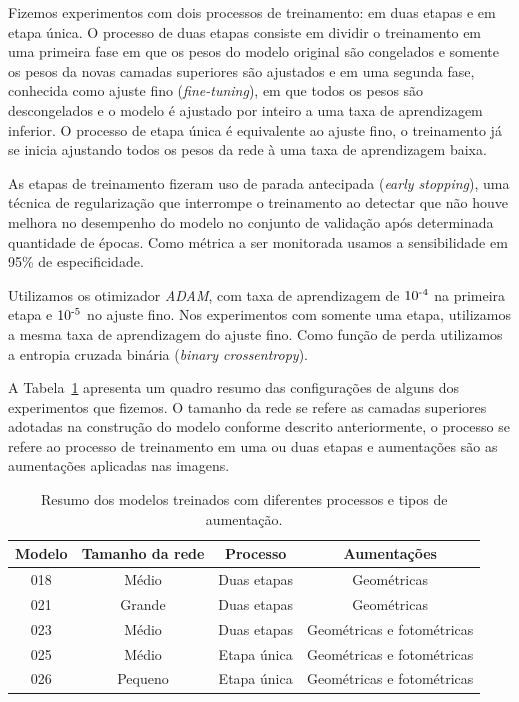 \documentclass[12pt]{article}
\begin{document}
Fizemos experimentos com dois processos de treinamento: em duas etapas e em etapa única. O processo de duas etapas consiste em dividir o treinamento em uma primeira fase em que os pesos do modelo original são congelados e somente os pesos da novas camadas superiores são ajustados e em uma segunda fase, conhecida como ajuste fino (\emph{fine-tuning}), em que todos os pesos são descongelados e o modelo é ajustado por inteiro a uma taxa de aprendizagem inferior. O processo de etapa única é equivalente ao ajuste fino, o treinamento já se inicia ajustando todos os pesos da rede à uma taxa de aprendizagem baixa.

As etapas de treinamento fizeram uso de parada antecipada (\emph{early stopping}), uma técnica de regularização que interrompe o treinamento ao detectar que não houve melhora no desempenho do modelo no conjunto de validação após determinada quantidade de épocas. Como métrica a ser monitorada usamos a sensibilidade em 95\% de especificidade.

Utilizamos os otimizador \emph{ADAM}, com taxa de aprendizagem de $10\textsuperscript{-4}$ na primeira etapa e $10\textsuperscript{-5}$ no ajuste fino. Nos experimentos com somente uma etapa, utilizamos a mesma taxa de aprendizagem do ajuste fino. Como função de perda utilizamos a entropia cruzada binária (\emph{binary crossentropy}).

A Tabela~\ref{tab:modelos_class_binaria} apresenta um quadro resumo das configurações de alguns dos experimentos que fizemos. O tamanho da rede se refere as camadas superiores adotadas na construção do modelo conforme descrito anteriormente, o processo se refere ao processo de treinamento em uma ou duas etapas e aumentações são as aumentações aplicadas nas imagens.

\begin{table}[h]
\centering
\begin{tabular}{cccc}
\toprule
\textbf{Modelo} & \textbf{Tamanho da rede} & \textbf{Processo} & \textbf{Aumentações} \\ 
\midrule
018 & Médio   & Duas etapas  & Geométricas \\ 
021 & Grande  & Duas etapas  & Geométricas \\ 
023 & Médio   & Duas etapas  & Geométricas e fotométricas \\ 
025 & Médio   & Etapa única  & Geométricas e fotométricas \\ 
026 & Pequeno & Etapa única  & Geométricas e fotométricas \\ 
\bottomrule
\end{tabular}
\caption{Resumo dos modelos treinados com diferentes processos e tipos de aumentação.}
\label{tab:modelos_class_binaria}
\end{table}
\end{document}
